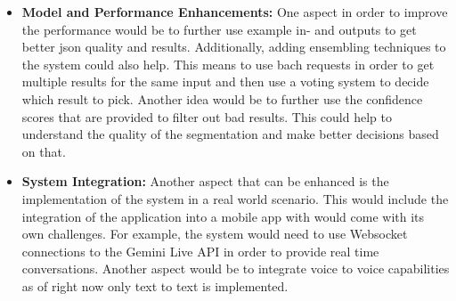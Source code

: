 \begin{itemize}
    \item \textbf{Model and Performance Enhancements:} One aspect in order to improve the performance would be to further use example in- and outputs to get better json quality and results. 
    Additionally, adding ensembling techniques to the system could also help. 
    This means to use bach requests in order to get multiple results for the same input and then use a voting system to decide which result to pick. 
    Another idea would be to further use the confidence scores that are provided to filter out bad results.
    This could help to understand the quality of the segmentation and make better decisions based on that.
    \item \textbf{System Integration:} Another aspect that can be enhanced is the implementation of the system in a real world scenario. 
    This would include the integration of the application into a mobile app with would come with its own challenges. 
    For example, the system would need to use Websocket connections to the Gemini Live API in order to provide real time conversations.
    Another aspect would be to integrate voice to voice capabilities as of right now only text to text is implemented.
\end{itemize}
